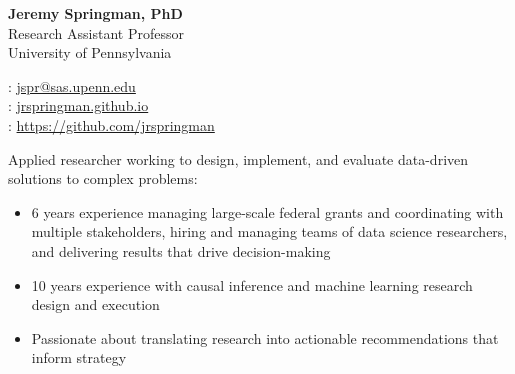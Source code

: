 \documentclass[11pt]{article}
\renewcommand{\today}{\monthname[\the\month] \the\year}
\begin{document}
\thispagestyle{empty}



\begin{multicols}{2}
{\Large {\bf Jeremy Springman, PhD}}\\
Research Assistant Professor\\
University of Pennsylvania\\

\columnbreak
\begin{flushright}

\faEnvelope: \href{mailto:jspr@sas.upenn.edu}{jspr@sas.upenn.edu}\\
\faLaptop: \url{jrspringman.github.io}\\
\faGithub: \url{https://github.com/jrspringman}\\
\end{flushright}
\end{multicols}
\vspace{-10pt}

Applied researcher working to design, implement, and evaluate data-driven solutions to complex problems:
\begin{itemize}[itemsep=0mm, parsep=0pt]
\item 6 years experience managing large-scale federal grants and coordinating with multiple stakeholders, hiring and managing teams of data science researchers, and delivering results that drive decision-making
\item 10 years experience with causal inference and machine learning research design and execution
\item Passionate about translating research into actionable recommendations that inform strategy
\end{itemize}
\end{document}
